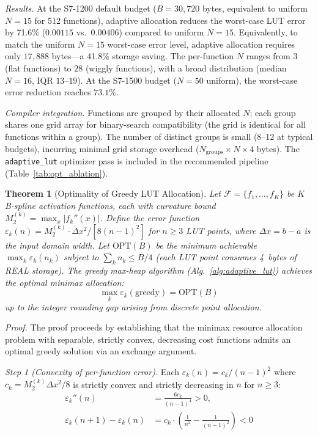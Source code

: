 \documentclass[journal,onecolumn]{IEEEtran}
\newtheorem{theorem}{Theorem}
\begin{document}
\textit{Results.} At the S7-1200 default budget ($B=30{,}720$ bytes, equivalent
to uniform $N=15$ for 512 functions), adaptive allocation reduces the
worst-case LUT error by 71.6\% ($0.00115$ vs.\ $0.00406$) compared to
uniform $N=15$. Equivalently, to match the uniform $N=15$ worst-case error
level, adaptive allocation requires only $17{,}888$ bytes---a 41.8\%
storage saving. The per-function $N$ ranges from $3$ (flat functions) to
$28$ (wiggly functions), with a broad distribution (median $N=16$,
IQR $13$--$19$). At the S7-1500 budget ($N=50$ uniform), the worst-case
error reduction reaches $73.1\%$.

\textit{Compiler integration.} Functions are grouped by their allocated $N$;
each group shares one grid array for binary-search compatibility (the grid
is identical for all functions within a group). The number of distinct
groups is small (8--12 at typical budgets), incurring minimal grid storage
overhead ($N_{\text{groups}} \times N \times 4$ bytes). The
\texttt{adaptive\_lut} optimizer pass is included in the recommended pipeline
(Table~\ref{tab:opt_ablation}).

\setcounter{theorem}{2}
\begin{theorem}[Optimality of Greedy LUT Allocation]
\label{thm:greedy}
Let $\mathcal{F} = \{f_1, \ldots, f_K\}$ be $K$ B-spline activation functions,
each with curvature bound $M_2^{(k)} = \max_x |f_k''(x)|$. Define the error
function $\varepsilon_k(n) = M_2^{(k)} \cdot \Delta x^2 / [8(n-1)^2]$ for
$n \geq 3$ LUT points, where $\Delta x = b-a$ is the input domain width.
Let $\text{OPT}(B)$ be the minimum achievable $\max_k \varepsilon_k(n_k)$
subject to $\sum_k n_k \leq B/4$ (each LUT point consumes 4~bytes of REAL
storage). The greedy max-heap algorithm (Alg.~\ref{alg:adaptive_lut})
achieves the optimal minimax allocation:
\begin{equation}
\max_k \varepsilon_k(\text{greedy}) = \text{OPT}(B)
\label{eq:greedy_optimal}
\end{equation}
up to the integer rounding gap arising from discrete point allocation.
\end{theorem}

\noindent\textit{Proof.} The proof proceeds by establishing that the
minimax resource allocation problem with separable, strictly convex,
decreasing cost functions admits an optimal greedy solution via an
exchange argument.

\noindent\textit{Step 1 (Convexity of per-function error).}
Each $\varepsilon_k(n) = c_k / (n-1)^2$ where $c_k = M_2^{(k)} \Delta
x^2 / 8$ is strictly convex and strictly decreasing in $n$ for
$n \geq 3$:
\begin{equation}
\begin{aligned}
\varepsilon_k''(n) &= \frac{6c_k}{(n-1)^4} > 0, \\
\varepsilon_k(n+1) - \varepsilon_k(n)
&= c_k \cdot \left(\frac{1}{n^2} - \frac{1}{(n-1)^2}\right) < 0
\end{aligned}
\label{eq:convexity}
\end{equation}
\end{document}
